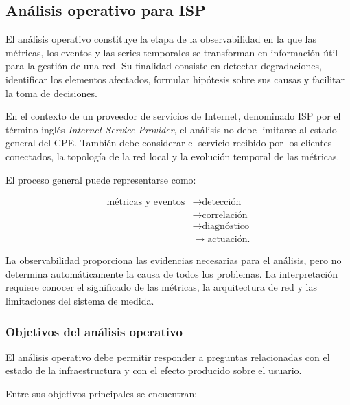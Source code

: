 \subsection{Análisis operativo para ISP}
\label{subsec:analisis-operativo-isp}

El análisis operativo constituye la etapa de la observabilidad en la que
las métricas, los eventos y las series temporales se transforman en
información útil para la gestión de una red. Su finalidad consiste en
detectar degradaciones, identificar los elementos afectados, formular
hipótesis sobre sus causas y facilitar la toma de decisiones.

En el contexto de un proveedor de servicios de Internet, denominado ISP
por el término inglés \textit{Internet Service Provider}, el análisis no
debe limitarse al estado general del CPE. También debe considerar el
servicio recibido por los clientes conectados, la topología de la red
local y la evolución temporal de las métricas.

El proceso general puede representarse como:

\[
\begin{aligned}
    \text{métricas y eventos}
    &\longrightarrow
    \text{detección}\\
    &\longrightarrow
    \text{correlación}\\
    &\longrightarrow
    \text{diagnóstico}\\
    &\longrightarrow
    \text{actuación}.
\end{aligned}
\]

La observabilidad proporciona las evidencias necesarias para el análisis,
pero no determina automáticamente la causa de todos los problemas. La
interpretación requiere conocer el significado de las métricas, la
arquitectura de red y las limitaciones del sistema de medida.


\subsubsection*{Objetivos del análisis operativo}

El análisis operativo debe permitir responder a preguntas relacionadas
con el estado de la infraestructura y con el efecto producido sobre el
usuario.

Entre sus objetivos principales se encuentran:

